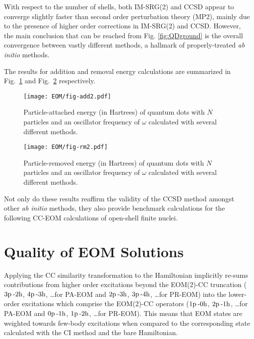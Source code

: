 \documentclass[thesis.tex]{subfiles}
\begin{document}
With respect to the number of shells, both IM-SRG(2) and CCSD appear to converge slightly faster than second order perturbation theory (MP2), mainly due to the presence of higher order corrections in IM-SRG(2) and CCSD.  However, the main conclusion that can be reached from Fig. \ref{fig:QDground} is the overall convergence between vastly different methods, a hallmark of properly-treated \emph{ab initio} methods.

The results for addition and removal energy calculations are summarized in Fig.\ \ref{fig:QDadd} and Fig.\ \ref{fig:QDrm} respectively.
\begin{figure}
  \centering
  \texttt{[image: EOM/fig-add2.pdf]}
  \caption{Particle-attached energy (in Hartrees) of quantum dots with $N$ particles and an oscillator frequency of $\omega$ calculated with several different methods.}
  \label{fig:QDadd}
\end{figure}

\begin{figure}
  \centering
  \texttt{[image: EOM/fig-rm2.pdf]}
  \caption{Particle-removed energy (in Hartrees) of quantum dots with $N$ particles and an oscillator frequency of $\omega$ calculated with several different methods.}
  \label{fig:QDrm}
\end{figure}

Not only do these results reaffirm the validity of the CCSD method amongst other \emph{ab initio} methods, they also provide benchmark calculations for the following CC-EOM calculations of open-shell finite nuclei.

\section{Quality of EOM Solutions} \label{section:eom_quality}

Applying the CC similarity transformation to the Hamiltonian implicitly re-sums contributions from higher order excitations beyond the EOM(2)-CC truncation ($3\mathrm{p}\hspace{2pt}\text{-}2\mathrm{h}$, $4\mathrm{p}\hspace{2pt}\text{-}3\mathrm{h}$, \ldots for PA-EOM and $2\mathrm{p}\hspace{2pt}\text{-}3\mathrm{h}$, $3\mathrm{p}\hspace{2pt}\text{-}4\mathrm{h}$, \ldots for PR-EOM) into the lower-order excitations which comprise the EOM(2)-CC operators ($1\mathrm{p}\hspace{2pt}\text{-}0\mathrm{h}$, $2\mathrm{p}\hspace{2pt}\text{-}1\mathrm{h}$, \ldots for PA-EOM and $0\mathrm{p}\hspace{2pt}\text{-}1\mathrm{h}$, $1\mathrm{p}\hspace{2pt}\text{-}2\mathrm{h}$, \ldots for PR-EOM).  This means that EOM states are weighted towards few-body excitations when compared to the corresponding state calculated with the CI method and the bare Hamiltonian.
\end{document}
